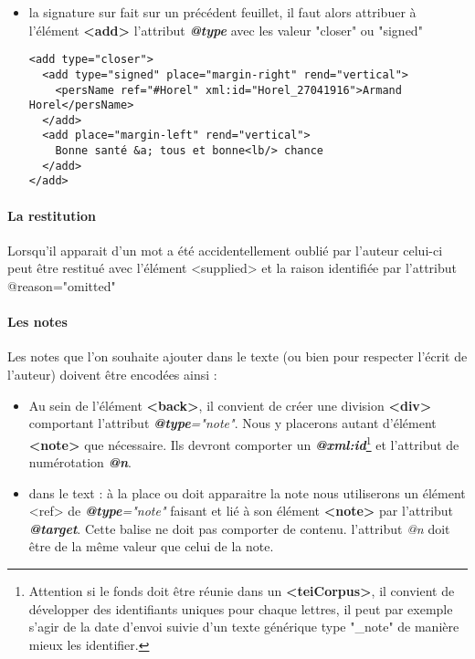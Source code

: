 \documentclass[18pt,a4paper,oneside]{book} %
\begin{document}
\begin{description}
\begin{itemize}
\item la signature sur fait sur un précédent feuillet, il faut alors attribuer à l'élément \textbf{<add>} l'attribut \textbf{\textit{@type}} avec les valeur "closer" ou "signed"
\begin{lstlisting}
<add type="closer">
  <add type="signed" place="margin-right" rend="vertical">                  
    <persName ref="#Horel" xml:id="Horel_27041916">Armand Horel</persName>               
  </add>
  <add place="margin-left" rend="vertical">
    Bonne santé &a; tous et bonne<lb/> chance
  </add>                                                              
</add>
\end{lstlisting}
\end{itemize} 
\end{description}

\paragraph{La restitution}

Lorsqu'il apparait d'un mot a été accidentellement oublié par l'auteur celui-ci peut être restitué avec l'élément <supplied> et la raison identifiée par l'attribut @reason="omitted"

\paragraph{Les notes}

Les notes que l'on souhaite ajouter dans le texte (ou bien pour respecter l'écrit de l'auteur) doivent être encodées ainsi : 
\begin{itemize}
\item Au sein de l'élément \textbf{<back>}, il convient de créer une division \textbf{<div>} comportant l'attribut \textit{\textbf{@type}="note"}. Nous y placerons autant d'élément \textbf{<note>} que nécessaire. Ils devront comporter un \textit{\textbf{@xml:id}}\footnote{Attention si le fonds doit être réunie dans un \textbf{<teiCorpus>}, il convient de développer des identifiants uniques pour chaque lettres, il peut par exemple s'agir de la date d'envoi suivie d'un texte générique type "\_note" de manière mieux les identifier.} et l'attribut de numérotation \textit{\textbf{@n}}.
\item dans le text : à la place ou doit apparaitre la note nous utiliserons un élément <ref> de \textit{\textbf{@type}="note"} faisant et lié à son élément \textbf{<note>} par l'attribut \textit{\textbf{@target}}. Cette balise ne doit pas comporter de contenu. l'attribut \textit{@n} doit être de la même valeur que celui de la note. 
\end{itemize} 
\bigskip 
\end{document}
